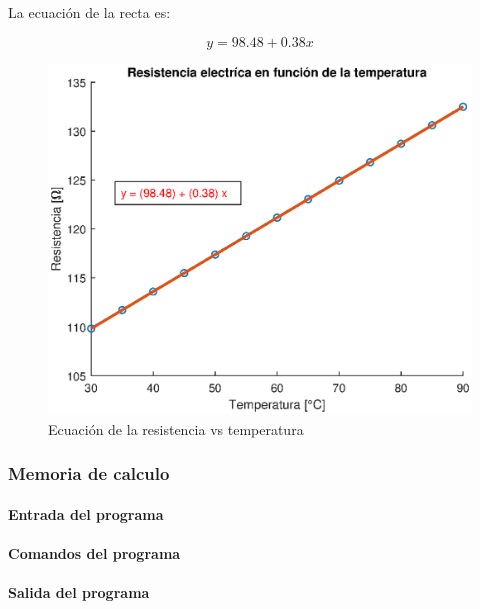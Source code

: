 \documentclass[letter,11pt]{article}
\begin{document}
La ecuación de la recta es:

\begin{equation}
    y = 98.48 + 0.38 x
\end{equation}

\begin{figure}[!h]
\centering
\includegraphics[scale=1.00]{resources/3.3.2.eps}
\caption{Ecuación de la resistencia vs temperatura}
\label{practica43_2}
\end{figure}

\subsubsection{Memoria de calculo}

\paragraph{Entrada del programa}
\begin{alltt}
\footnotesize

\normalsize
\end{alltt}

\paragraph{Comandos del programa}
\begin{alltt}
\footnotesize

\normalsize
\end{alltt}

\paragraph{Salida del programa}
\begin{alltt}
\footnotesize

\normalsize
\end{alltt}
\end{document}
